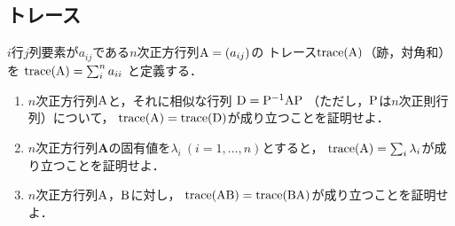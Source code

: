 \subsection{トレース}
    $i$行$j$列要素が$a_{ij}$である$n$次正方行列$\mathrm{A}=(a_{ij})$の
    トレース$\operatorname{trace}(\mathrm{A})$（跡，対角和）を
    $\operatorname{trace}(\mathrm{A}) = \sum_i^n a_{ii}$
    と定義する．
    \begin{enumerate}[label=(\roman*)]
      \item $n$次正方行列$\mathrm{A}$と，それに相似な行列
        $\mathrm{D} = \mathrm{P}^{-1}\mathrm{A}\mathrm{P}$
        （ただし，$\mathrm{P}$は$n$次正則行列）について，
        $\operatorname{trace}(\mathrm{A}) = \operatorname{trace}(\mathrm{D})$が成り立つことを証明せよ．
      \item $n$次正方行列${\boldsymbol A}$の固有値を$\lambda_i\ (i=1,\ldots,n)$とすると，
        $\operatorname{trace}(\mathrm{A}) = \sum_i \lambda_i$が成り立つことを証明せよ．
      \item $n$次正方行列$\mathrm{A}$，$\mathrm{B}$に対し，
        $\operatorname{trace}(\mathrm{A}\mathrm{B}) = \operatorname{trace}(\mathrm{B}\mathrm{A})$が成り立つことを証明せよ．
    \end{enumerate}

